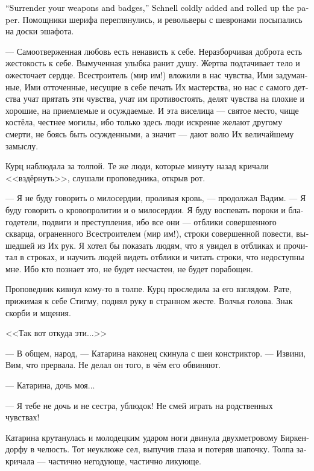 \documentclass[a4paper,12pt,fleqn]{book}\usepackage{cooltooltips}\usepackage{polyglossia}\setdefaultlanguage[babelshorthands=true]{russian}\setotherlanguage{english}\defaultfontfeatures{Ligatures=TeX,Mapping=tex-text} \usepackage{xcolor}\definecolor{lightgray}{HTML}{bbbbbb}\color{lightgray}\newcommand{\ml}[3]{\textenglish{\textcolor{black}{#3}}}
\newcommand{\textspace}{\vspace{1em}{\centering\Large\bfseries<...>\par}\vspace{1em}}
\begin{document}
\ml{$0$}
{--- Сдайте оружие и значки, --- сухо добавил Шнелль, свернув приказ в трубочку.}
{``Surrender your weapons and badges,'' Schnell coldly added and rolled up the paper.}
Помощники шерифа переглянулись, и револьверы с шевронами посыпались на доски эшафота.

\textspace

--- Самоотверженная любовь есть ненависть к себе.
Неразборчивая доброта есть жестокость к себе.
Вымученная улыбка ранит душу.
Жертва подтачивает тело и ожесточает сердце.
Всестроитель (мир им!) вложили в нас чувства, Ими задуманные, Ими отточенные, несущие в себе печать Их мастерства, но нас с самого детства учат прятать эти чувства, учат им противостоять, делят чувства на плохие и хорошие, на приемлемые и осуждаемые.
И эта виселица --- святое место, чище костёла, честнее могилы, ибо только здесь люди искренне желают другому смерти, не боясь быть осужденными, а значит --- дают волю Их величайшему замыслу.

Курц наблюдала за толпой.
Те же люди, которые минуту назад кричали <<вздёрнуть>>, слушали проповедника, открыв рот.

--- Я не буду говорить о милосердии, проливая кровь, --- продолжал Вадим.
--- Я буду говорить о кровопролитии и о милосердии.
Я буду воспевать пороки и благодетели, подвиги и преступления, ибо все они --- отблики совершенного скварца, ограненного Всестроителем (мир им!), строки совершенной повести, вышедшей из Их рук.
Я хотел бы показать людям, что я увидел в отбликах и прочитал в строках, и научить людей видеть отблики и читать строки, что недоступны мне.
Ибо кто познает это, не будет несчастен, не будет порабощен.

Проповедник кивнул кому-то в толпе.
Курц проследила за его взглядом.
Рате, прижимая к себе Стигму, поднял руку в странном жесте.
Волчья голова.
Знак скорби и мщения.

<<Так вот откуда эти...>>

--- В общем, народ, --- Катарина наконец скинула с шеи констриктор.
--- Извини, Вим, что прервала.
Не делал он того, в чём его обвиняют.

--- Катарина, дочь моя...

--- Я тебе не дочь и не сестра, ублюдок!
Не смей играть на родственных чувствах!

Катарина крутанулась и молодецким ударом ноги двинула двухметровому Биркендорфу в челюсть.
Тот неуклюже сел, выпучив глаза и потеряв шапочку.
Толпа закричала --- частично негодующе, частично ликующе.
\end{document}
